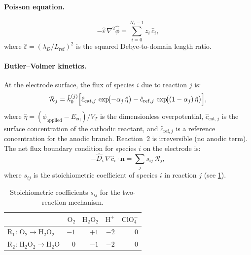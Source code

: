\documentclass[11pt,a4paper]{article}
\newcommand{\vect}[1]{\boldsymbol{#1}}
\begin{document}
\paragraph{Poisson equation.}
\begin{equation}\label{eq:Poisson}
  -\hat{\varepsilon}\, \nabla^2 \hat{\phi}
  = \sum_{i=0}^{N_s-1} z_i\, \hat{c}_i,
\end{equation}
where $\hat{\varepsilon} = (\lambda_D / L_{\mathrm{ref}})^2$ is the
squared Debye-to-domain length ratio.

\paragraph{Butler--Volmer kinetics.}
At the electrode surface, the flux of species $i$ due to reaction $j$ is:
\begin{equation}\label{eq:BV}
  \mathcal{R}_j = \hat{k}_0^{(j)} \Bigl[
    \hat{c}_{\mathrm{cat},j}\, \exp\!\bigl(-\alpha_j\, \hat{\eta}\bigr)
    - \hat{c}_{\mathrm{ref},j}\, \exp\!\bigl((1-\alpha_j)\,\hat{\eta}\bigr)
  \Bigr],
\end{equation}
where $\hat{\eta} = (\phi_{\mathrm{applied}} - E_{\mathrm{eq}})/V_T$ is
the dimensionless overpotential, $\hat{c}_{\mathrm{cat},j}$ is the
surface concentration of the cathodic reactant, and $\hat{c}_{\mathrm{ref},j}$
is a reference concentration for the anodic branch. Reaction~2 is
irreversible (no anodic term). The net flux boundary condition for
species $i$ on the electrode is:
\begin{equation}\label{eq:BV_flux}
  -\hat{D}_i\,\nabla \hat{c}_i \cdot \vect{n}
  = \sum_j s_{ij}\, \mathcal{R}_j,
\end{equation}
where $s_{ij}$ is the stoichiometric coefficient of species $i$ in
reaction $j$ (see \cref{tab:stoichiometry}).

\begin{table}[H]
\centering
\caption{Stoichiometric coefficients $s_{ij}$ for the two-reaction mechanism.}
\label{tab:stoichiometry}
\begin{tabular}{lrrrr}
\toprule
& $\mathrm{O_2}$ & $\mathrm{H_2O_2}$ & $\mathrm{H^+}$ & $\mathrm{ClO_4^-}$ \\
\midrule
R$_1$: $\mathrm{O_2} \to \mathrm{H_2O_2}$ & $-1$ & $+1$ & $-2$ & $0$ \\
R$_2$: $\mathrm{H_2O_2} \to \mathrm{H_2O}$ & $0$ & $-1$ & $-2$ & $0$ \\
\bottomrule
\end{tabular}
\end{table}
\end{document}

